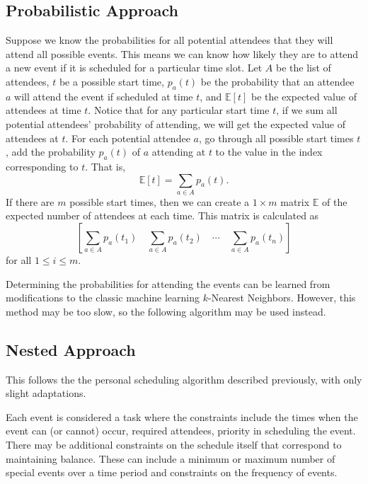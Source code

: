 \documentclass{article}
\newcommand{\todo}[1]{}
\begin{document}
	\subsection{Probabilistic Approach}
		Suppose we know the probabilities for all potential attendees that they will attend all possible events.
		This means we can know how likely they are to attend a new event if it is scheduled for a particular time slot.
		Let $A$ be the list of attendees, $t$ be a possible start time, $p_a(t)$ be the probability that an attendee $a$ will attend the event if scheduled at time $t$, and $\mathbb{E}[t]$ be the expected value of attendees at time $t$.
		Notice that for any particular start time $t$, if we sum all potential attendees' probability of attending, we will get the expected value of attendees at $t$.
		For each potential attendee $a$, go through all possible start times $t$, add the probability $p_a(t)$ of $a$ attending at $t$ to the value in the index corresponding to $t$.
		That is, 
		\[ \mathbb{E}[t] = \sum_{a \in A} p_a(t). \]
		If there are $m$ possible start times, then we can create a $1 \times m$ matrix $\mathbb{E}$ of the expected number of attendees at each time.
		This matrix is calculated as
		\[  \todo{``Fix matrix formatting''}
			\left[ \sum_{a \in A} p_a(t_1) \quad \sum_{a \in A} p_a(t_2) \quad  \cdots \quad \sum_{a \in A} p_a(t_n) \right]
		\]
		for all $1 \le i \le m$.
	
		Determining the probabilities for attending the events can be learned from modifications to the classic machine learning $k$-Nearest Neighbors.
		However, this method may be too slow, so the following algorithm may be used instead.
		
	\subsection{Nested Approach}
		This follows the the personal scheduling algorithm described previously, with only slight adaptations.
		
		Each event is considered a task where the constraints include the times when the event can (or cannot) occur, required attendees, priority in scheduling the event.
		There may be additional constraints on the schedule itself that correspond to maintaining balance.
		These can include a minimum or maximum number of special events over a time period and constraints on the frequency of events.
\end{document}
